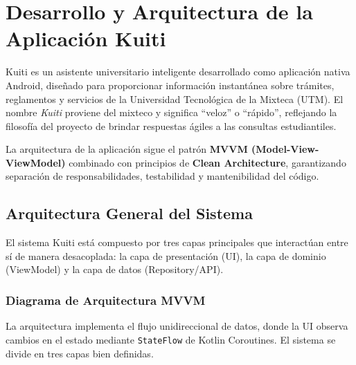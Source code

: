 
\section[Arquitectura de Kuiti]{Desarrollo y Arquitectura de la Aplicación Kuiti}
\label{sec:arquitectura_kuiti}

Kuiti es un asistente universitario inteligente desarrollado como aplicación nativa Android, diseñado para proporcionar información instantánea sobre trámites, reglamentos y servicios de la Universidad Tecnológica de la Mixteca (UTM). El nombre \textit{Kuiti} proviene del mixteco y significa ``veloz'' o ``rápido'', reflejando la filosofía del proyecto de brindar respuestas ágiles a las consultas estudiantiles.

La arquitectura de la aplicación sigue el patrón \textbf{MVVM (Model-View-ViewModel)} combinado con principios de \textbf{Clean Architecture}, garantizando separación de responsabilidades, testabilidad y mantenibilidad del código.

\vspace{1em}
\subsection{Arquitectura General del Sistema}
\label{subsec:arquitectura_general}

El sistema Kuiti está compuesto por tres capas principales que interactúan entre sí de manera desacoplada: la capa de presentación (UI), la capa de dominio (ViewModel) y la capa de datos (Repository/API).

\subsubsection{Diagrama de Arquitectura MVVM}
\label{subsubsec:diagrama_mvvm}

La arquitectura implementa el flujo unidireccional de datos, donde la UI observa cambios en el estado mediante \texttt{StateFlow} de Kotlin Coroutines. El sistema se divide en tres capas bien definidas.

